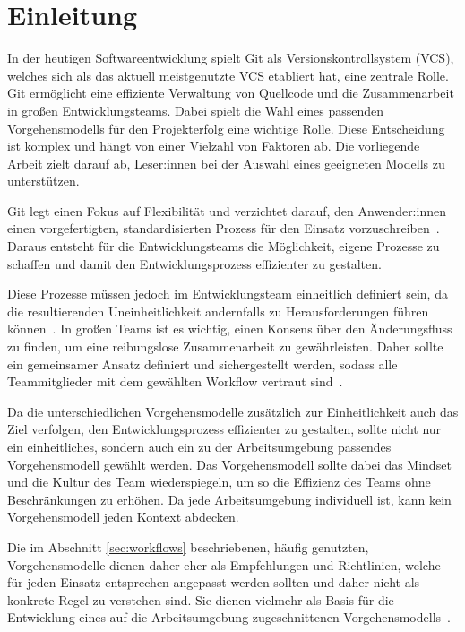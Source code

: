 
\setcounter{page}{1}

\section{Einleitung}
\label{sec:einleitung}

In der heutigen Softwareentwicklung spielt Git als Versionskontrollsystem (VCS), welches sich als das aktuell meistgenutzte VCS etabliert hat, eine zentrale Rolle. Git ermöglicht eine effiziente Verwaltung von Quellcode und die Zusammenarbeit in großen Entwicklungsteams. Dabei spielt die Wahl eines passenden Vorgehensmodells für den Projekterfolg eine wichtige Rolle. Diese Entscheidung ist komplex und hängt von einer Vielzahl von Faktoren ab. Die vorliegende Arbeit zielt darauf ab, Leser:innen bei der Auswahl eines geeigneten Modells zu unterstützen.

Git legt einen Fokus auf Flexibilität und verzichtet darauf, den Anwender:innen einen vorgefertigten, standardisierten Prozess für den Einsatz vorzuschreiben~\cite{atlassianComparingGitWorkflows2023}. Daraus entsteht für die Entwicklungsteams die Möglichkeit, eigene Prozesse zu schaffen und damit den Entwicklungsprozess effizienter zu gestalten. 

Diese Prozesse müssen jedoch im Entwicklungsteam einheitlich definiert sein, da die resultierenden Uneinheitlichkeit andernfalls zu Herausforderungen führen können~\cite{gitlabWhatGitWorkflow2023}. In großen Teams ist es wichtig, einen Konsens über den Änderungsfluss zu finden, um eine reibungslose Zusammenarbeit zu gewährleisten. Daher sollte ein gemeinsamer Ansatz definiert und sichergestellt werden, sodass alle Teammitglieder mit dem gewählten Workflow vertraut sind~\cite{atlassianComparingGitWorkflows2023}.

Da die unterschiedlichen Vorgehensmodelle zusätzlich zur Einheitlichkeit auch das Ziel verfolgen, den Entwicklungsprozess effizienter zu gestalten, sollte nicht nur ein einheitliches, sondern auch ein zu der Arbeitsumgebung passendes Vorgehensmodell gewählt werden. 
Das Vorgehensmodell sollte dabei das Mindset und die Kultur des Team wiederspiegeln, um so die Effizienz des Teams ohne Beschränkungen zu erhöhen. Da jede Arbeitsumgebung individuell ist, kann kein Vorgehensmodell jeden Kontext abdecken.

Die im Abschnitt \autoref{sec:workflows} beschriebenen, häufig genutzten, Vorgehensmodelle dienen daher eher als Empfehlungen und Richtlinien, welche für jeden Einsatz entsprechen angepasst werden sollten und daher nicht als konkrete Regel zu verstehen sind. Sie dienen vielmehr als Basis für die Entwicklung eines auf die Arbeitsumgebung zugeschnittenen Vorgehensmodells~\cite{atlassianComparingGitWorkflows2023}.

